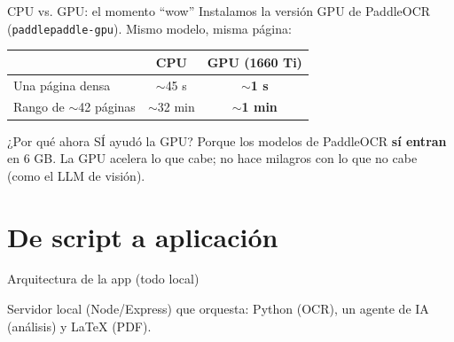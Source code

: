 \documentclass[10pt,aspectratio=169]{beamer}
\begin{document}
\begin{frame}{CPU vs. GPU: el momento ``wow''}
  Instalamos la versión GPU de PaddleOCR (\texttt{paddlepaddle-gpu}). Mismo modelo, misma página:
  \vfill
  \centering
  \begin{tabular}{@{}lcc@{}}
    \toprule
    & \textbf{CPU} & \textbf{GPU (1660 Ti)} \\
    \midrule
    Una página densa & $\sim$45 s & \textbf{$\sim$1 s} \\
    Rango de $\sim$42 páginas & $\sim$32 min & \textbf{$\sim$1 min} \\
    \bottomrule
  \end{tabular}
  \vfill
  \begin{block}{¿Por qué ahora SÍ ayudó la GPU?}
    Porque los modelos de PaddleOCR \textbf{sí entran} en 6 GB. La GPU acelera lo que cabe; no hace milagros con lo que no cabe (como el LLM de visión).
  \end{block}
\end{frame}

\section{De script a aplicación}

\begin{frame}{Arquitectura de la app (todo local)}
  \centering
  \vfill
  \footnotesize Servidor local (Node/Express) que orquesta: Python (OCR), un agente de IA (análisis) y LaTeX (PDF).
\end{frame}
\end{document}
